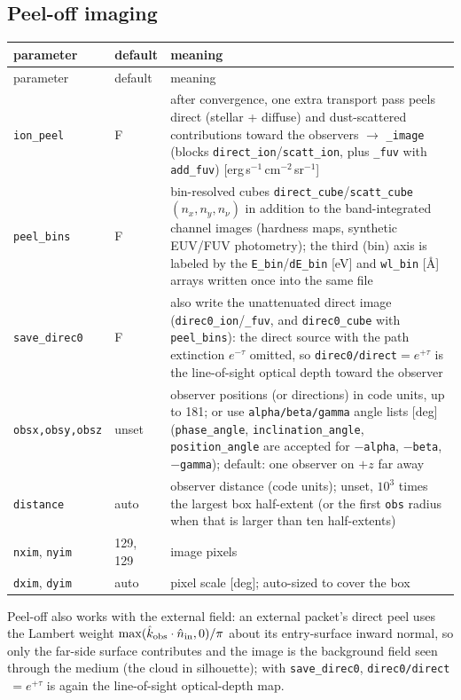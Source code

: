 \documentclass[english,a4paper]{my_memo}
\newcommand{\code}[1]{\texttt{#1}}
\begin{document}
\subsection{Peel-off imaging}
{\small
\begin{longtable}{llp{7.0cm}}
\toprule
parameter & default & meaning \\
\midrule
\endfirsthead
\toprule
parameter & default & meaning \\
\midrule
\endhead
\bottomrule
\endlastfoot
\code{ion\_peel} & F & after convergence, one extra transport pass peels direct (stellar + diffuse) and dust-scattered contributions toward the observers $\rightarrow$ \code{\_image} (blocks \code{direct\_ion}/\code{scatt\_ion}, plus \code{\_fuv} with \code{add\_fuv}) [erg\,s$^{-1}$\,cm$^{-2}$\,sr$^{-1}$] \\
\code{peel\_bins} & F & bin-resolved cubes \code{direct\_cube}/\code{scatt\_cube} $(n_x, n_y, n_\nu)$ in addition to the band-integrated channel images (hardness maps, synthetic EUV/FUV photometry); the third (bin) axis is labeled by the \code{E\_bin}/\code{dE\_bin} [eV] and \code{wl\_bin} [\AA] arrays written once into the same file \\
\code{save\_direc0} & F & also write the unattenuated direct image (\code{direc0\_ion}/\code{\_fuv}, and \code{direc0\_cube} with \code{peel\_bins}): the direct source with the path extinction $e^{-\tau}$ omitted, so \code{direc0/direct}$=e^{+\tau}$ is the line-of-sight optical depth toward the observer \\
\code{obsx,obsy,obsz} & unset & observer positions (or directions) in code units, up to 181; or use \code{alpha/beta/gamma} angle lists [deg] (\code{phase\_angle}, \code{inclination\_angle}, \code{position\_angle} are accepted for $-$\code{alpha}, $-$\code{beta}, $-$\code{gamma}); default: one observer on $+z$ far away \\
\code{distance} & auto & observer distance (code units); unset, $10^3$ times the largest box half-extent (or the first \code{obs} radius when that is larger than ten half-extents) \\
\code{nxim}, \code{nyim} & 129, 129 & image pixels \\
\code{dxim}, \code{dyim} & auto & pixel scale [deg]; auto-sized to cover the box \\
\end{longtable}
}
Peel-off also works with the external field: an external packet's direct
peel uses the Lambert weight
$\max(\hat k_{\rm obs}\cdot\hat n_{\rm in},0)/\pi$ about its entry-surface
inward normal, so only the far-side surface contributes and the image is
the background field seen through the medium (the cloud in silhouette);
with \code{save\_direc0}, \code{direc0/direct}$\,=e^{+\tau}$ is again the
line-of-sight optical-depth map.
\end{document}
